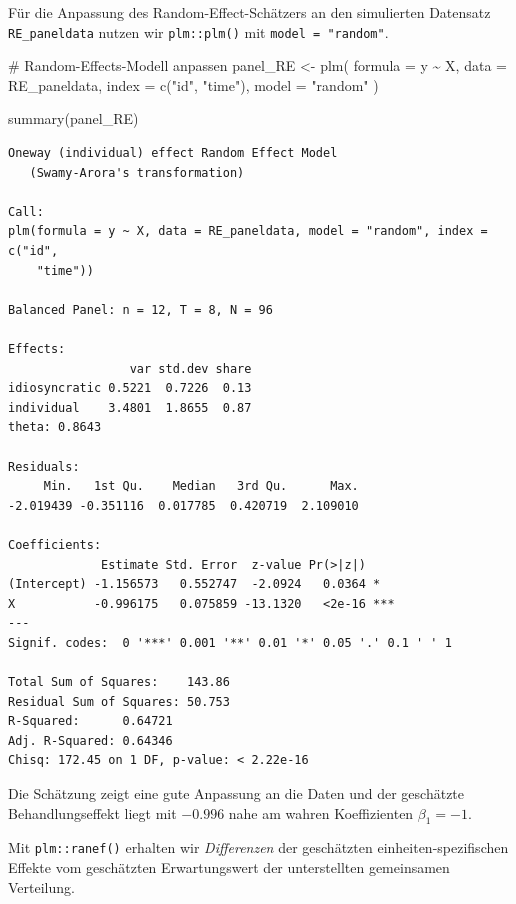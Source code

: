 \documentclass[
  a4paper,
  DIV=11,
  oneside]{scrreprt}
\newenvironment{Shaded}{\begin{snugshade}}{\end{snugshade}}
\newcommand{\AttributeTok}[1]{\textcolor[rgb]{0.40,0.45,0.13}{#1}}
\newcommand{\CommentTok}[1]{\textcolor[rgb]{0.37,0.37,0.37}{#1}}
\newcommand{\FunctionTok}[1]{\textcolor[rgb]{0.28,0.35,0.67}{#1}}
\newcommand{\NormalTok}[1]{\textcolor[rgb]{0.00,0.23,0.31}{#1}}
\newcommand{\OtherTok}[1]{\textcolor[rgb]{0.00,0.23,0.31}{#1}}
\newcommand{\SpecialCharTok}[1]{\textcolor[rgb]{0.37,0.37,0.37}{#1}}
\newcommand{\StringTok}[1]{\textcolor[rgb]{0.13,0.47,0.30}{#1}}
\begin{document}
Für die Anpassung des Random-Effect-Schätzers an den simulierten
Datensatz \texttt{RE\_paneldata} nutzen wir \texttt{plm::plm()} mit
\texttt{model\ =\ "random"}.

\begin{Shaded}
\begin{Highlighting}[]
\CommentTok{\# Random{-}Effects{-}Modell anpassen}
\NormalTok{panel\_RE }\OtherTok{\textless{}{-}} \FunctionTok{plm}\NormalTok{(}
  \AttributeTok{formula =}\NormalTok{ y }\SpecialCharTok{\textasciitilde{}}\NormalTok{ X, }
  \AttributeTok{data =}\NormalTok{ RE\_paneldata, }
  \AttributeTok{index =} \FunctionTok{c}\NormalTok{(}\StringTok{"id"}\NormalTok{, }\StringTok{"time"}\NormalTok{), }
  \AttributeTok{model =} \StringTok{"random"}
\NormalTok{)}

\FunctionTok{summary}\NormalTok{(panel\_RE)}
\end{Highlighting}
\end{Shaded}

\begin{verbatim}
Oneway (individual) effect Random Effect Model 
   (Swamy-Arora's transformation)

Call:
plm(formula = y ~ X, data = RE_paneldata, model = "random", index = c("id", 
    "time"))

Balanced Panel: n = 12, T = 8, N = 96

Effects:
                 var std.dev share
idiosyncratic 0.5221  0.7226  0.13
individual    3.4801  1.8655  0.87
theta: 0.8643

Residuals:
     Min.   1st Qu.    Median   3rd Qu.      Max. 
-2.019439 -0.351116  0.017785  0.420719  2.109010 

Coefficients:
             Estimate Std. Error  z-value Pr(>|z|)    
(Intercept) -1.156573   0.552747  -2.0924   0.0364 *  
X           -0.996175   0.075859 -13.1320   <2e-16 ***
---
Signif. codes:  0 '***' 0.001 '**' 0.01 '*' 0.05 '.' 0.1 ' ' 1

Total Sum of Squares:    143.86
Residual Sum of Squares: 50.753
R-Squared:      0.64721
Adj. R-Squared: 0.64346
Chisq: 172.45 on 1 DF, p-value: < 2.22e-16
\end{verbatim}

Die Schätzung zeigt eine gute Anpassung an die Daten und der geschätzte
Behandlungseffekt liegt mit \(-0.996\) nahe am wahren Koeffizienten
\(\beta_1 = -1\).

Mit \texttt{plm::ranef()} erhalten wir \emph{Differenzen} der
geschätzten einheiten-spezifischen Effekte vom geschätzten
Erwartungswert der unterstellten gemeinsamen Verteilung.
\end{document}
